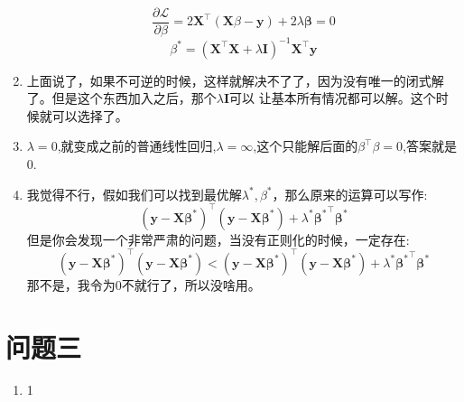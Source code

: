 \documentclass[answers]{exam}  %
\begin{document}
\begin{enumerate}[label=\alph*.]
\begin{equation*}
        \frac{\partial \mathcal{L}}{\partial \beta} = 2\mathbf{X}^\top (\mathbf{X}\beta - \mathbf{y}) + 2\lambda \mathbf{\beta}= 0
    \end{equation*}
    \begin{equation*}
        \beta^* = (\mathbf{X}^\top\mathbf{X} + \lambda \mathbf{I})^{-1} \mathbf{X}^\top \mathbf{y}
    \end{equation*}
    \item 上面说了，如果不可逆的时候，这样就解决不了了，因为没有唯一的闭式解了。但是这个东西加入之后，那个$\lambda\mathbf{I}$可以
    让基本所有情况都可以解。这个时候就可以选择了。
    \item $\lambda=0$,就变成之前的普通线性回归,$\lambda=\infty$,这个只能解后面的$\beta^\top\beta = 0$,答案就是0.
    \item 我觉得不行，假如我们可以找到最优解$\lambda^*, \beta^*$，那么原来的运算可以写作:
    \begin{equation*}
        (\mathbf{y} - \mathbf{X} \mathbf{\beta^*})^\top (\mathbf{y} - \mathbf{X} \mathbf{\beta^*}) + \lambda^* \mathbf{\beta^*}^\top \mathbf{\beta^*}
    \end{equation*}
    但是你会发现一个非常严肃的问题，当没有正则化的时候，一定存在:
    \begin{equation*}
        (\mathbf{y} - \mathbf{X} \mathbf{\beta^*})^\top (\mathbf{y} - \mathbf{X} \mathbf{\beta^*}) < (\mathbf{y} - \mathbf{X} \mathbf{\beta^*})^\top (\mathbf{y} - \mathbf{X} \mathbf{\beta^*}) + \lambda^* \mathbf{\beta^*}^\top \mathbf{\beta^*}
    \end{equation*}
    那不是，我令为0不就行了，所以没啥用。
\end{enumerate}


\section{问题三}
\begin{enumerate}[label=\alph*.] 
    \item 1
\end{enumerate}
\end{document}
